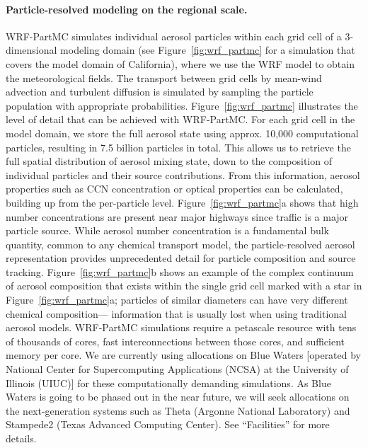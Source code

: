 \documentclass[11pt]{article}
\begin{document}
\paragraph{Particle-resolved modeling on the regional scale.} WRF-PartMC
simulates individual aerosol particles within each grid cell of a
3-dimensional modeling domain (see Figure~\ref{fig:wrf_partmc} for a
simulation that covers the model domain of California), where we use the WRF
model to obtain the meteorological fields. The transport between grid cells by
mean-wind advection and turbulent diffusion is simulated by sampling the
particle population with appropriate probabilities.
Figure~\ref{fig:wrf_partmc} illustrates the level of detail that can be
achieved with WRF-PartMC. For each grid cell in the model domain, we store the
full aerosol state using approx. 10,000 computational particles, resulting in
7.5 billion particles in total. This allows us to retrieve the full spatial
distribution of aerosol mixing state, down to the composition of individual
particles and their source contributions. From this information, aerosol
properties such as CCN concentration or optical properties can be calculated,
building up from the per-particle level. Figure~\ref{fig:wrf_partmc}a shows
that high number concentrations are present near major highways since traffic
is a major particle source. While aerosol number concentration is a
fundamental bulk quantity, common to any chemical transport model, the
particle-resolved aerosol representation provides unprecedented detail for
particle composition and source tracking. Figure~\ref{fig:wrf_partmc}b shows
an example of the complex continuum of aerosol composition that exists within
the single grid cell marked with a star in Figure~\ref{fig:wrf_partmc}a;
particles of similar diameters can have very different chemical composition---
information that is usually lost when using traditional aerosol models.
WRF-PartMC simulations require a petascale resource with tens of thousands of
cores, fast interconnections between those cores, and sufficient memory per
core. We are currently using allocations on Blue Waters [operated by National
Center for Supercomputing Applications (NCSA) at the University of Illinois
(UIUC)] for these computationally demanding simulations. As Blue Waters is
going to be phased out in the near future, we will seek allocations on the
next-generation systems such as Theta (Argonne National Laboratory) and
Stampede2 (Texas Advanced Computing Center). See ``Facilities'' for more
details.
\end{document}
